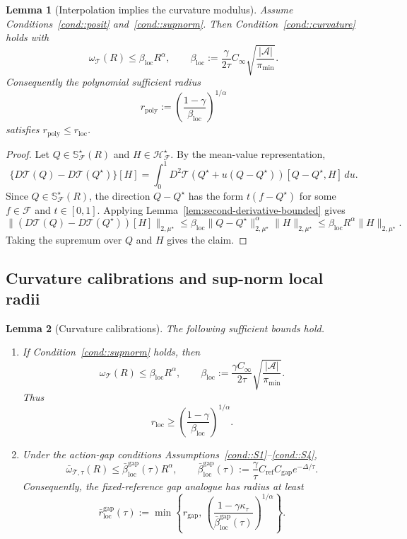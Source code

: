\documentclass{article}
\newcommand{\loc}{\mathrm{loc}}
\theoremstyle{plain}
\newtheorem{lemma}{Lemma}
\theoremstyle{definition}
\theoremstyle{remark}
\begin{document}
\begin{lemma}[Interpolation implies the curvature modulus]
\label{lem:interpolation-implies-curvature}
Assume Conditions~\ref{cond::posit} and~\ref{cond::supnorm}. Then
Condition~\ref{cond::curvature} holds with
\[
\omega_{\mathcal T}(R)
\le
\beta_{\loc}R^\alpha,
\qquad
\beta_{\loc}
:=
\frac{\gamma}{2\tau}
C_{\infty}\sqrt{\frac{|\mathcal A|}{\pi_{\min}}}.
\]
Consequently the polynomial sufficient radius
\[
r_{\mathrm{poly}}
:=
\left(\frac{1-\gamma}{\beta_{\loc}}\right)^{1/\alpha}
\]
satisfies \(r_{\mathrm{poly}}\le r_{\mathrm{loc}}\).
\end{lemma}
\begin{proof}
Let \(Q\in\mathbb S_{\mathcal F}^\star(R)\) and
\(H\in\mathcal H_{\mathcal F}^\star\). By the mean-value representation,
\[
\{D\mathcal T(Q)-D\mathcal T(Q^\star)\}[H]
=
\int_0^1
D^2\mathcal T(Q^\star+u(Q-Q^\star))[Q-Q^\star,H]\,du .
\]
Since \(Q\in\mathbb S_{\mathcal F}^\star(R)\), the direction
\(Q-Q^\star\) has the form \(t(f-Q^\star)\) for some
\(f\in\mathcal F\) and \(t\in[0,1]\).
Applying Lemma~\ref{lem:second-derivative-bounded} gives
\[
\|(D\mathcal T(Q)-D\mathcal T(Q^\star))[H]\|_{2,\mu^\star}
\le
\beta_{\loc}\|Q-Q^\star\|_{2,\mu^\star}^{\alpha}
\|H\|_{2,\mu^\star}
\le
\beta_{\loc}R^\alpha\|H\|_{2,\mu^\star}.
\]
Taking the supremum over \(Q\) and \(H\) gives the claim.
\end{proof}

\subsection{Curvature calibrations and sup-norm local radii}
\label{app:proof-curvature-calibrations}

\begin{lemma}[Curvature calibrations]
\label{lem:curvature-calibrations}
The following sufficient bounds hold.
\begin{enumerate}[leftmargin=1.5em,label=(\roman*)]
\item If Condition~\ref{cond::supnorm} holds, then
\[
\omega_{\mathcal T}(R)
\le
\beta_{\loc}R^\alpha,
\qquad
\beta_{\loc}
:=
\frac{\gamma C_{\infty}}{2\tau}
\sqrt{\frac{|\mathcal A|}{\pi_{\min}}}.
\]
Thus
\[
r_{\mathrm{loc}}
\ge
\left(\frac{1-\gamma}{\beta_{\loc}}\right)^{1/\alpha}.
\]

\item Under the action-gap conditions
Assumptions~\ref{cond::S1}--\ref{cond::S4},
\[
\bar\omega_{\mathcal T,\tau}(R)
\le
\bar\beta_{\loc}^{\mathrm{gap}}(\tau)R^\alpha,
\qquad
\bar\beta_{\loc}^{\mathrm{gap}}(\tau)
:=
\frac{\gamma}{\tau}
C_{\mathrm{ref}}C_{\mathrm{gap}}e^{-\Delta/\tau}.
\]
Consequently, the fixed-reference gap analogue has radius at least
\[
\bar r_{\mathrm{loc}}^{\mathrm{gap}}(\tau)
:=
\min\!\left\{
r_{\mathrm{gap}},\,
\left(\frac{1-\gamma\kappa_\tau}
{\bar\beta_{\loc}^{\mathrm{gap}}(\tau)}\right)^{1/\alpha}
\right\}.
\]
\end{enumerate}
\end{lemma}
\end{document}
